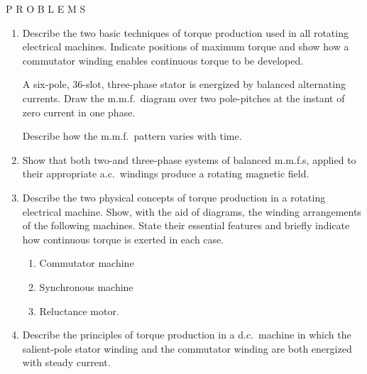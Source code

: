 \documentclass[a4paper,numbers=noenddot,12pt]{scrbook}
\begin{document}
\begingroup
\fontsize{10pt}{12pt}\selectfont
\begin{center}
    P R O B L E M S
\end{center}

\begin{enumerate}[label={\thechapter.\arabic*},leftmargin=*]
    \item Describe the two basic techniques of torque production used in all rotating electrical machines. Indicate positions of maximum torque and show how a commutator winding enables continuous torque to be developed.

        A six-pole, 36-slot, three-phase stator is energized by balanced alternating currents. Draw the m.m.f.\ diagram over two pole-pitches at the instant of zero current in one phase.

        Describe how the m.m.f.\ pattern varies with time.
    \item Show that both two-and three-phase systems of balanced m.m.f.s, applied to their appropriate a.c.\ windings produce a rotating magnetic field. 
    \item Describe the two physical concepts of torque production in a rotating electrical machine. Show, with the aid of diagrams, the winding arrangements of the following machines. State their essential features and briefly indicate how continuous torque is exerted in each case. 
        \begin{enumerate}
            \item Commutator machine 
            \item Synchronous machine
            \item Reluctance motor.
        \end{enumerate}
    \item Describe the principles of torque production in a d.c.\ machine in which the salient-pole stator winding and the commutator winding are both energized with steady current. 


\end{enumerate}
\end{document}
